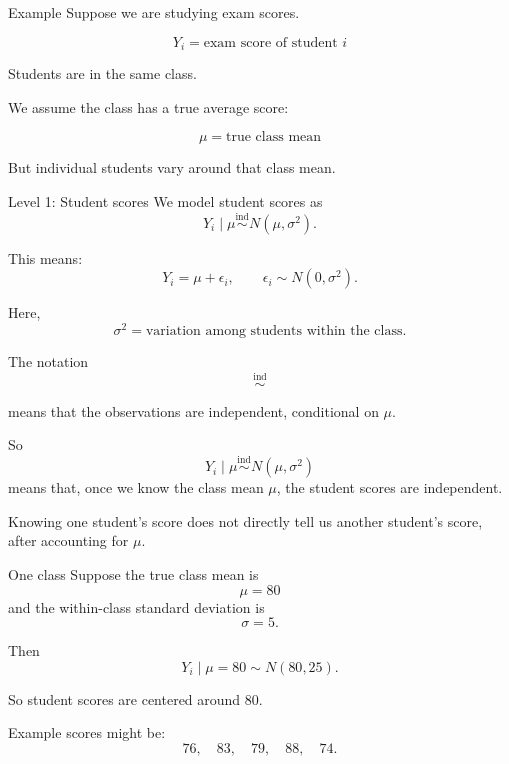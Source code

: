 \documentclass[aspectratio=43,11pt]{beamer}
\begin{document}
{
\begin{frame}{Example}
Suppose we are studying exam scores.

\[
Y_i = \text{exam score of student } i
\]

\medskip
Students are in the same class.

\medskip
We assume the class has a true average score:

\[
\mu = \text{true class mean}
\]

\medskip
But individual students vary around that class mean.
\end{frame}

\begin{frame}{Level 1: Student scores}
We model student scores as
\[
Y_i \mid \mu \overset{\text{ind}}{\sim} N(\mu,\sigma^2).
\]

\medskip
This means:
\[
Y_i = \mu + \epsilon_i,
\qquad
\epsilon_i \sim N(0,\sigma^2).
\]

Here,
\[
\sigma^2 = \text{variation among students within the class}.
\]
\end{frame}

\begin{frame}{}
The notation
\[
\overset{\text{ind}}{\sim}
\]

means that the observations are independent, conditional on \(\mu\).

\medskip
So
\[
Y_i \mid \mu \overset{\text{ind}}{\sim} N(\mu,\sigma^2)
\]
means that, once we know the class mean \(\mu\), the student scores are independent.

\medskip
Knowing one student's score does not directly tell us another student's score, after accounting for \(\mu\).
\end{frame}

\begin{frame}{One class}
Suppose the true class mean is
\[
\mu = 80
\]
and the within-class standard deviation is
\[
\sigma = 5.
\]

Then
\[
Y_i \mid \mu = 80 \sim N(80,25).
\]

So student scores are centered around 80.

\medskip
Example scores might be:
\[
76,\quad 83,\quad 79,\quad 88,\quad 74.
\]
\end{frame}

}
\end{document}
